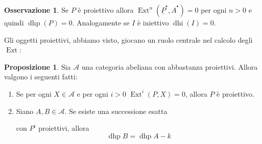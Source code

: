 \documentclass[a4paper,11pt,oneside]{book}
\newcommand{\A}{\mathcal{A}}
\newcommand{\complx}[1]{#1^{^\bullet}}
\DeclareMathOperator{\Ext}{Ext}
\DeclareMathOperator{\dhp}{dhp}
\DeclareMathOperator{\dhi}{dhi}
\theoremstyle{definition}
\newtheorem{prop}{Proposizione}
\newtheorem{oss}[section]{Osservazione}
\begin{document}
\begin{oss}
 Se $P$ è proiettivo allora $\Ext^n(\complx {\underline P},\complx A)=0$ per ogni
 $n>0$ e quindi $\dhp(P)=0$. Analogamente se $I$ è iniettivo $\dhi(I)=0$.
\end{oss}

Gli oggetti proiettivi, abbiamo visto, giocano un ruolo centrale nel calcolo degli $\Ext$:
\begin{prop}
 Sia $\A$ una categoria abeliana con abbastanza proiettivi. Allora valgono i seguenti fatti:
 \begin{enumerate}
  \item Se per ogni $X\in \A$ e per ogni $i>0$ $\Ext^i(P,X)=0$, allora $P$ è proiettivo.
  \item Siano $A,B\in\A$. Se esiste una successione esatta 
  \begin{center}
  \end{center}
   con $P^i$ proiettivi, allora
   \[
    \dhp B=\dhp A -k
   \]
 \end{enumerate}
\end{prop}
\end{document}
